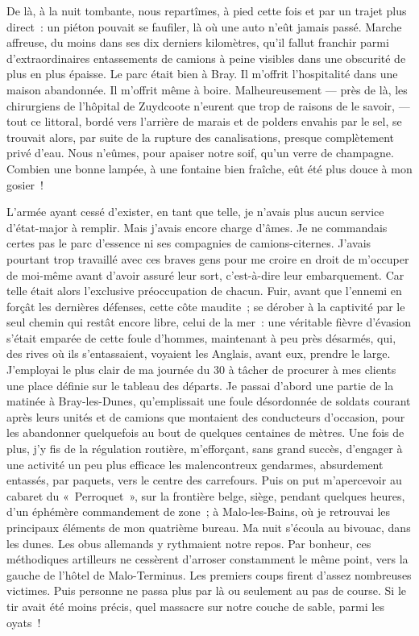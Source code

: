 \documentclass[french,twoside]{book} %
\begin{document}
De là, à la nuit tombante, nous repartîmes, à pied cette fois et par un trajet plus direct : un piéton pouvait se faufiler, là où une auto n’eût jamais passé. Marche affreuse, du moins dans ses dix derniers   kilomètres, qu’il fallut franchir parmi d’extraordinaires entassements de camions à peine visibles dans une obscurité de plus en plus épaisse. Le parc était bien à Bray. Il m’offrit l’hospitalité dans une maison abandonnée. Il m’offrit même à boire. Malheureusement — près de là, les chirurgiens de l’hôpital de Zuydcoote n’eurent que trop de raisons de le savoir, — tout ce littoral, bordé vers l’arrière de marais et de polders envahis par le sel, se trouvait alors, par suite de la rupture des canalisations, presque complètement privé d’eau. Nous n’eûmes, pour apaiser notre soif, qu’un verre de champagne. Combien une bonne lampée, à une fontaine bien fraîche, eût été plus douce à mon gosier !\par
L’armée ayant cessé d’exister, en tant que telle, je n’avais plus aucun service d’état-major à remplir. Mais j’avais encore charge d’âmes. Je ne commandais certes pas le parc d’essence ni ses compagnies de camions-citernes. J’avais pourtant trop travaillé avec ces braves gens pour me croire en droit de m’occuper de moi-même avant d’avoir assuré leur sort, c’est-à-dire leur embarquement. Car telle était alors l’exclusive préoccupation de chacun. Fuir, avant que l’ennemi en forçât les dernières défenses, cette côte maudite ; se dérober à la captivité par le seul chemin qui restât encore libre, celui de la mer : une véritable fièvre d’évasion s’était emparée de cette foule d’hommes, maintenant à peu près désarmés, qui, des rives où ils s’entassaient, voyaient les Anglais, avant eux, prendre le large. J’employai le plus clair de ma journée du 30 à tâcher de procurer à mes clients une place définie sur le tableau des départs. Je passai d’abord une partie de la matinée à Bray-les-Dunes, qu’emplissait une foule désordonnée de soldats courant après leurs unités et de camions que montaient des conducteurs d’occasion, pour les abandonner quelquefois au bout de quelques centaines de mètres. Une fois de plus, j’y fis de la régulation   routière, m’efforçant, sans grand succès, d’engager à une activité un peu plus efficace les malencontreux gendarmes, absurdement entassés, par paquets, vers le centre des carrefours. Puis on put m’apercevoir au cabaret du « Perroquet », sur la frontière belge, siège, pendant quelques heures, d’un éphémère commandement de zone ; à Malo-les-Bains, où je retrouvai les principaux éléments de mon quatrième bureau. Ma nuit s’écoula au bivouac, dans les dunes. Les obus allemands y rythmaient notre repos. Par bonheur, ces méthodiques artilleurs ne cessèrent d’arroser constamment le même point, vers la gauche de l’hôtel de Malo-Terminus. Les premiers coups firent d’assez nombreuses victimes. Puis personne ne passa plus par là ou seulement au pas de course. Si le tir avait été moins précis, quel massacre sur notre couche de sable, parmi les oyats !\par
\end{document}
